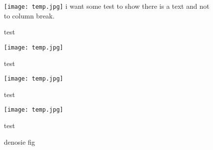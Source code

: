 
\begin{figure}[h]

\label{fig:四栏图片}
\begin{multicols}{4}
\texttt{[image: temp.jpg]}
i want  some test to show there is a text and not to column break.\\
\centerline{test}
\columnbreak
\texttt{[image: temp.jpg]}
\centerline{test}
\columnbreak
\texttt{[image: temp.jpg]}
\centerline{test}
\columnbreak
\texttt{[image: temp.jpg]}
\centerline{test}
\end{multicols}
\caption{denosie fig}

\end{figure}

